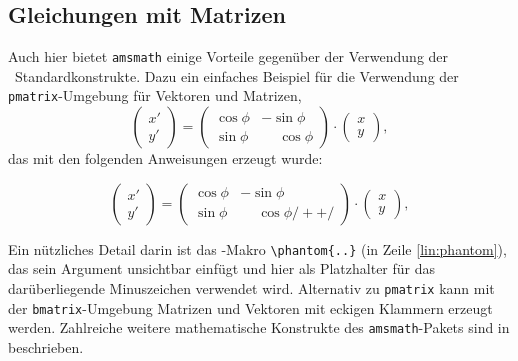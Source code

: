 \subsection{Gleichungen mit Matrizen}

Auch hier bietet \texttt{amsmath} einige Vorteile gegenüber der Verwendung der \latex\ Standardkonstrukte. Dazu ein einfaches Beispiel für die Verwendung der \texttt{pmatrix}-Umgebung für Vektoren und Matrizen,
%
\begin{equation}
	\begin{pmatrix} x' \\ y' \end{pmatrix}
	= 
	\begin{pmatrix}
	  \cos \phi & -\sin \phi \\
	  \sin \phi & \phantom{-}\cos \phi
	\end{pmatrix} 
	\cdot
	\begin{pmatrix}	x \\ y \end{pmatrix} ,
\end{equation}
%
das mit den folgenden Anweisungen erzeugt wurde:
%
\begin{LaTeXCode}[numbers=none]
\begin{equation}
	\begin{pmatrix} 
			x' \\ 
			y' 
	\end{pmatrix}
	= 
	\begin{pmatrix}
		  \cos \phi & -\sin \phi \\
		  \sin \phi & \phantom{-}\cos \phi /+ \label{lin:phantom} +/
	\end{pmatrix} 
	\cdot
	\begin{pmatrix} 
			x \\ 
			y 
	\end{pmatrix} ,
\end{equation}
\end{LaTeXCode}
%
Ein nützliches Detail darin ist das \tex-Makro \verb!\phantom{..}! (in Zeile \ref{lin:phantom}), das sein Argument unsichtbar einfügt und hier als Platzhalter für das darüberliegende Minuszeichen verwendet wird. Alternativ zu \texttt{pmatrix} kann mit der \texttt{bmatrix}-Umgebung Matrizen
und Vektoren mit eckigen Klammern erzeugt werden.
Zahlreiche weitere mathematische Konstrukte des \texttt{amsmath}-Pakets sind in \cite{amsldoc02} beschrieben.

